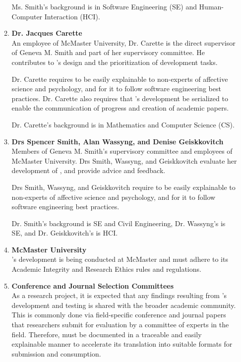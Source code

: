 \begin{itemize}
\begin{enumerate}
        Ms. Smith's background is in Software Engineering (SE) and
        Human-Computer Interaction (HCI).

        \item \textbf{Dr. Jacques Carette} \\
        An employee of McMaster University, Dr. Carette is the direct
        supervisor of Geneva M. Smith and part of her supervisory committee. He
        contributes to \progname{}'s design and the prioritization of
        development tasks.

        Dr. Carette requires \progname{} to be easily explainable to
        non-experts of affective science and psychology, and for it to follow
        software engineering best practices. Dr. Carette also requires that
        \progname{}'s development be serialized to enable the communication of
        progress and creation of academic papers.

        Dr. Carette's background is in Mathematics and Computer Science (CS).

        \item \textbf{Drs Spencer Smith, Alan Wassyng, and Denise Geiskkovitch}
        \\
        Members of Geneva M. Smith's supervisory committee and employees of
        McMaster University. Drs Smith, Wassyng, and Geiskkovitch evaluate her
        development of \progname{}, and provide advice and feedback.

        Drs Smith, Wassyng, and Geiskkovitch require \progname{} to be easily
        explainable to non-experts of affective science and psychology, and for
        it to follow software engineering best practices.

        Dr. Smith's background is SE and Civil Engineering, Dr. Wassyng's is
        SE, and Dr. Geiskkovitch's is HCI.

        \item \textbf{McMaster University} \\
        \progname{}'s development is being conducted at McMaster and must
        adhere to its Academic Integrity and Research Ethics rules and
        regulations.

        \item \textbf{Conference and Journal Selection Committees} \\
        As a research project, it is expected that any findings resulting from
        \progname{}'s development and testing is shared with the broader
        academic community. This is commonly done via field-specific conference
        and journal papers that researchers submit for evaluation by a
        committee of experts in the field. Therefore, \progname{} must be
        documented in a traceable and easily explainable manner to accelerate
        its translation into suitable formats for submission and consumption.


\end{enumerate}
\end{itemize}
